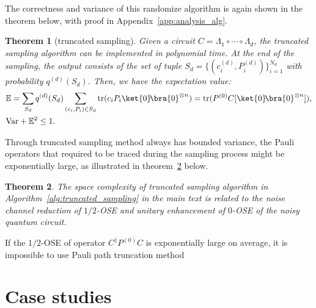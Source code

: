 \documentclass[aps,%
twocolumn,%
floatfix,%
pra,%
amsfonts,%
longbibliography,%
groupedaddress,%
superscriptaddress]{revtex4-2}%
\newtheorem{theorem}{Theorem}
\newcommand{\1}{\mathbbm{1}}
\begin{document}
The correctness and variance of this randomize algorithm is again shown in the theorem below, with proof in Appendix~\ref{app:analysis_alg}. 
\begin{theorem}[truncated sampling] \label{theo:truncated_sampling}
     Given a circuit $C = \Lambda_1 \circ \cdots \circ \Lambda_{d}$, the truncated sampling algorithm can be implemented in polynomial time. At the end of the sampling, the output consists of the set of tuple $S_d= \{(c_i^{(d)}, P_i^{(d)})\}_{i=1}^{N_d}$ with probability $q^{(d)}(S_d)$. Then, we have the expectation value:
\begin{align}
    &\mathbb{E} = \sum_{S_d}q^{(d)}(S_d) \sum_{(c_i, P_i)\in S_d} \text{tr}(c_i P_i \ket{0}\!\bra{0}^{\otimes n}) = \text{tr}( P^{(0)} C[\ket{0}\!\bra{0}^{\otimes n}] ),\\
        &\text{Var} + \mathbb{E}^2 \leq 1.
\end{align}
\end{theorem}
Through truncated sampling method always has bounded variance, the Pauli operators that required to be traced during the sampling process might be exponentially large, as illustrated in theorem~\ref{theo:space_complexity} below.
\color{red}
\begin{theorem}
\label{theo:space_complexity}
    The space complexity of truncated sampling algorithm in Algorithm~\ref{alg:truncated_sampling} in the main text is related to the noise channel reduction of $1/2$-OSE and unitary enhancement of $0$-OSE of the noisy quantum circuit. 
\end{theorem}
\color{black}

If the $1/2$-OSE of operator $C^\dagger P^{(0)}C$ is exponentially large on average, it is impossible to use Pauli path truncation method
\section{Case studies}
\end{document}
